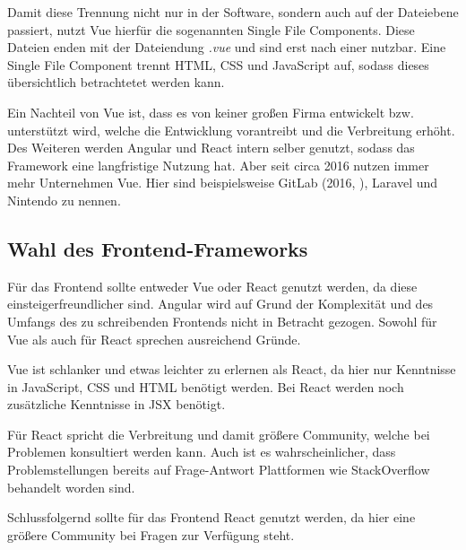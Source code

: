 Damit diese Trennung nicht nur in der Software, sondern auch auf der Dateiebene passiert, nutzt Vue hierfür die sogenannten Single File Components. Diese Dateien enden mit der Dateiendung \textit{.vue} und sind erst nach einer  nutzbar. Eine Single File Component trennt HTML, CSS und JavaScript auf, sodass dieses übersichtlich betrachtetet werden kann. \cite{teufelVueJsTutorial2018a}

Ein Nachteil von Vue ist, dass es von keiner großen Firma entwickelt bzw. unterstützt wird, welche die Entwicklung vorantreibt und die Verbreitung erhöht. Des Weiteren werden Angular und React intern selber genutzt, sodass das Framework eine langfristige Nutzung hat. Aber seit circa 2016 nutzen immer mehr Unternehmen Vue. Hier sind beispielsweise GitLab (2016, \cite{schatzWhyWeChose2016}), Laravel und Nintendo zu nennen. \cite{techuzTopWebsitesBuilt2018}

\subsection{Wahl des Frontend-Frameworks}

Für das Frontend sollte entweder Vue oder React genutzt werden, da diese einsteigerfreundlicher sind. Angular wird auf Grund der Komplexität und des Umfangs des zu schreibenden Frontends nicht in Betracht gezogen. Sowohl für Vue als auch für React sprechen ausreichend Gründe. 

Vue ist schlanker und etwas leichter zu erlernen als React, da hier nur Kenntnisse in JavaScript, CSS und HTML benötigt werden. Bei React werden noch zusätzliche Kenntnisse in JSX benötigt.

Für React spricht die Verbreitung und damit größere Community, welche bei Problemen konsultiert werden kann. Auch ist es wahrscheinlicher, dass Problemstellungen bereits auf Frage-Antwort Plattformen wie StackOverflow behandelt worden sind. 

Schlussfolgernd sollte für das Frontend React genutzt werden, da hier eine größere Community bei Fragen zur Verfügung steht.

